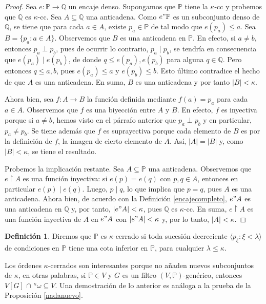 \documentclass[11pt]{unam_tesis1}
\theoremstyle{MyThmStyle}
\theoremstyle{definition}
\newtheorem{definition}{Definici\'on}[chapter]
\theoremstyle{plain}
\theoremstyle{remark}
\def\rest{\mathop{\upharpoonright}\nolimits}
\let\leq\leqslant
\begin{document}
\begin{proof}
Sea $e:\mathbb P\to \mathbb Q$ un encaje denso. Supongamos que $\mathbb P$ tiene la $\kappa$-cc y probemos que $\mathbb Q$ es $\kappa$-cc. Sea $A\subseteq \mathbb Q$ una anticadena. Como $e"\mathbb P$ es un subconjunto denso de $\mathbb Q$, se tiene que para cada $a\in A$, existe $p_a\in \mathbb P$ de tal modo que $e(p_a)\leq a$. Sea $B=\{p_a:a\in A\}$. Observemos que $B$ es una anticadena en $\mathbb P$. En efecto, si $a\neq b$, entonces $p_a\perp p_b$, pues de ocurrir lo contrario, $p_a\mid p_b$, se tendr\'ia en consecuencia que $e(p_a)\mid e(p_b)$, de donde $q\leq e(p_a),e(p_b)$ para alguna $q\in \mathbb Q$. Pero entonces $q\leq a,b$, pues $e(p_a)\leq a$ y $e(p_b)\leq b$. Esto \'ultimo contradice el hecho de que $A$ es una anticadena. En suma, $B$ es una anticadena y por tanto $|B|<\kappa$.

Ahora bien, sea $f:A\to B$ la funci\'on definida mediante $f(a)=p_a$ para cada $a\in A$. Observemos que $f$ es una biyecci\'on entre $A$ y $B$. En efecto, $f$ es inyectiva porque si $a\neq b$, hemos visto en el p\'arrafo anterior que $p_a\perp p_b$ y en particular, $p_a\neq p_b$.  Se tiene adem\'as que $f$ es suprayectiva porque cada elemento de $B$ es por la definici\'on de $f$, la imagen de cierto elemento de $A$. As\'i, $|A|=|B|$ y, como $|B|<\kappa$, se tiene el resultado.

Probemos la implicaci\'on restante. Sea $A\subseteq \mathbb P$ una anticadena. Observemos que $e\rest A$ es una funci\'on inyectiva: si $e(p)=e(q)$ con $p,q\in A$, entonces en particular $e(p)\mid e(q)$. Luego, $p\mid q$, lo que implica que $p=q$, pues $A$ es una anticadena. Ahora bien, de acuerdo con la Definici\'on \ref{encajecompleto}, $e"A$ es una anticadena en $\mathbb Q$ y, por tanto, $|e"A|<\kappa$, pues $\mathbb Q$ es $\kappa$-cc. En suma, $e\rest A$ es una funci\'on inyectiva de $A$ en $e"A$ con $|e"A|<\kappa$ y, por lo tanto, $|A|<\kappa$.
\end{proof}


\begin{definition}
Diremos que $\mathbb P$ es $\kappa$-cerrado si toda sucesi\'on decreciente $\langle p_\xi: \xi<\lambda \rangle$ de condiciones en $\mathbb P$ tiene una cota inferior en $\mathbb P$, para cualquier $\lambda\leq\kappa$.
\end{definition}

Los \'ordenes $\kappa$-cerrados son interesantes porque no a\~naden nuevos subconjuntos de $\kappa$, en otras palabras, si $\mathbb P\in V$ y $G$ es un filtro $(V,\mathbb P)$-gen\'erico, entonces $V[G]$ $\cap$ $^\kappa\omega\subseteq V$. Una demostraci\'on de lo anterior es an\'aloga a la prueba de la Proposici\'on \ref{nadanuevo}.
\end{document}
